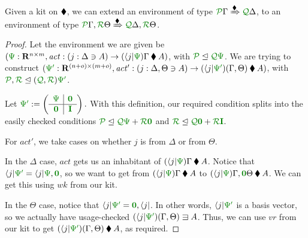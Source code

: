 \documentclass[submission,copyright,creativecommons]{eptcs}
\begin{document}
\begin{lemma}\label{lem:bind}
  Given a kit on $\mathbin{\blacklozenge}$, we can extend an environment of type
  $\ctx{\Gamma}{P} \subst{\kitrel} \ctx{\Delta}{Q}$, to an environment of type
  $\ctx{\Gamma}{P}, \ctx{\Theta}{R} \subst{\kitrel}
  \ctx{\Delta}{Q}, \ctx{\Theta}{R}$.
\end{lemma}
\begin{proof}
  Let the environment we are given be
  $(\rescomment\Psi : \mathbf R^{n \times m},
  \mathit{act} : (j : \Delta \ni A) \to (\langle j \rvert\rescomment\Psi)\Gamma \kitrel A)$,
  with $\resctx P \subres \resctx Q \rescomment\Psi$.
  We are trying to construct
  $(\rescomment{\Psi'} : \mathbf R^{(n + o) \times (m + o)},
  \mathit{act'} : (j : \Delta, \Theta \ni A) \to
  (\langle j \rvert\rescomment{\Psi'})(\Gamma, \Theta) \kitrel A)$,
  with $\resctx P, \resctx R \subres (\resctx Q, \resctx R) \rescomment{\Psi'}$.

  Let \(
    \rescomment{\Psi'} := \left(\begin{array}{c|c}
                                  \rescomment\Psi & \rescomment{\mat 0}
                                  \\ \hline
                                  \rescomment{\mat 0} & \rescomment{\mat I}
                                \end{array}\right).
  \)
  With this definition, our required condition splits into the easily checked
  conditions
  $\resctx P \subres \resctx Q\rescomment\Psi + \resctx R\rescomment{\mat 0}$
  and
  $\resctx R \subres
  \resctx Q\rescomment{\mat 0} + \resctx R\rescomment{\mat I}$.

  For $\mathit{act'}$, we take cases on whether $j$ is from $\Delta$ or from
  $\Theta$.

  In the $\Delta$ case, $\mathit{act}$ gets us an inhabitant of
  $(\langle j \rvert\rescomment\Psi)\Gamma \kitrel A$.
  Notice that
  $\langle j \rvert\rescomment{\Psi'} =
  \langle j \rvert\rescomment\Psi, \rescomment{\vct 0}$,
  so we want to get from $(\langle j \rvert\rescomment\Psi)\Gamma \kitrel A$ to
  $(\langle j \rvert\rescomment\Psi)\Gamma, \rescomment{\vct 0}\Theta
  \kitrel A$.
  We can get this using $\mathit{wk}$ from our kit.

  In the $\Theta$ case, notice that
  $\langle j \rvert\rescomment{\Psi'} = \rescomment{\vct 0}, \langle j \rvert$.
  In other words, $\langle j \rvert\rescomment{\Psi'}$ is a basis vector, so we
  actually have usage-checked
  $(\langle j \rvert\rescomment{\Psi'})(\Gamma, \Theta) \lvar A$.
  Thus, we can use $\mathit{vr}$ from our kit to get
  $(\langle j \rvert\rescomment{\Psi'})(\Gamma, \Theta) \kitrel A$, as required.
\end{proof}
\end{document}
